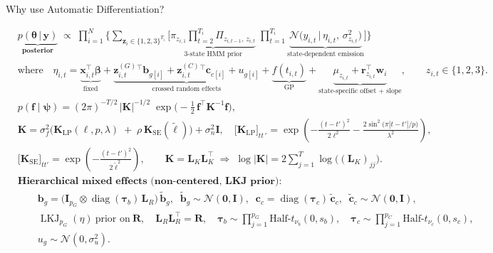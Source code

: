\documentclass[dvipsnames]{beamer}
\begin{document}
\begin{frame}{Why use Automatic Differentiation?}

\tiny
\begin{align*}
&\underbrace{p\!\left(
\boldsymbol{\theta} \,\big|\, \mathbf y
\right)}_{\textbf{posterior}}
\;\propto\;
\prod_{i=1}^{N}
\Bigg\{
\sum_{\mathbf z_i \in \{1,2,3\}^{T_i}}
\!\Bigg[
\underbrace{\pi_{z_{i,1}}\prod_{t=2}^{T_i}\Pi_{z_{i,t-1},\,z_{i,t}}}_{\text{3-state HMM prior}}
\;
\prod_{t=1}^{T_i}
\underbrace{\mathcal N\!\Big(
y_{i,t}\,\Big|\,\eta_{i,t},\,\sigma_{z_{i,t}}^{2}
\Big)}_{\text{state-dependent emission}}
\Bigg]
\Bigg\}
\\[-2pt]
&\text{where}\quad
\eta_{i,t}
=\underbrace{\mathbf x_{i,t}^{\!\top}\boldsymbol\beta}_{\text{fixed}}
+\underbrace{\mathbf z^{(G)}_{i,t}{}^{\!\top}\mathbf b_{g[i]}
+\mathbf z^{(C)}_{i,t}{}^{\!\top}\mathbf c_{c[i]}
+u_{g[i]}}_{\text{crossed random effects}}
+\underbrace{f(t_{i,t})}_{\text{GP}}
+\underbrace{\mu_{z_{i,t}}
+\mathbf r_{z_{i,t}}^{\!\top}\mathbf w_i}_{\text{state-specific offset + slope}}
,\qquad z_{i,t}\in\{1,2,3\}.
\\[4pt]
&
p(\mathbf f\mid\boldsymbol\psi)
=
(2\pi)^{-T/2}\,|\mathbf K|^{-1/2}\;
\exp\!\Big(-\tfrac12\,\mathbf f^{\!\top}\mathbf K^{-1}\mathbf f\Big),
\\[-2pt]
&
\mathbf K
=\sigma_f^{2}\Big(\mathbf K_{\text{LP}}(\ell,p,\lambda)\;+\;\rho\,\mathbf K_{\text{SE}}(\tilde\ell)\Big)
+\sigma_n^{2}\mathbf I,\quad
\big[\mathbf K_{\text{LP}}\big]_{t t\,'}
=\exp\!\left(
-\frac{(t-t')^{2}}{2\ell^{2}}
-\frac{2\sin^{2}\!\big(\pi|t-t'|/p\big)}{\lambda^{2}}
\right),
\\[-2pt]
&
\big[\mathbf K_{\text{SE}}\big]_{t t'}
=
\exp\!\left(-\frac{(t-t')^{2}}{2\tilde\ell^{2}}\right),
\qquad
\mathbf K=\mathbf L_K\mathbf L_K^{\!\top}
\;\Rightarrow\;
\log|\mathbf K|=2\sum_{j=1}^{T}\log \big((\mathbf L_K)_{jj}\big).
\\[6pt]
&\textbf{Hierarchical mixed effects (non-centered, LKJ prior):}
\\[-2pt]
&\qquad
\mathbf b_{g}=\big(\mathbf I_{p_G}\otimes\operatorname{diag}(\boldsymbol\tau_b)\,\mathbf L_R\big)\,\tilde{\mathbf b}_{g},
\;\;
\tilde{\mathbf b}_{g}\sim\mathcal N(\mathbf 0,\mathbf I),
\;\;
\mathbf c_{c}=\operatorname{diag}(\boldsymbol\tau_c)\,\tilde{\mathbf c}_{c},
\;\;
\tilde{\mathbf c}_{c}\sim\mathcal N(\mathbf 0,\mathbf I),
\\[-2pt]
&\qquad
\operatorname{LKJ}_{p_G}(\eta)\ \text{prior on}\ \mathbf R,\quad
\mathbf L_R\mathbf L_R^{\!\top}=\mathbf R,
\quad
\boldsymbol\tau_b\sim\prod_{j=1}^{p_G}\text{Half-}t_{\nu_b}(0,s_b),
\quad
\boldsymbol\tau_c\sim\prod_{j=1}^{p_C}\text{Half-}t_{\nu_c}(0,s_c),
\\[-2pt]
&\qquad
u_g\sim\mathcal N(0,\sigma_u^2).
\end{align*}
\end{frame}
\end{document}

